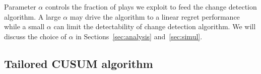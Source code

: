 \documentclass[letterpaper]{article} %
\begin{document}

Parameter $\alpha$
controls the fraction of plays we exploit to feed the change detection algorithm. A large $\alpha$ may drive the algorithm to a linear regret performance while a small $\alpha$ can limit the detectability of change detection algorithm. We will discuss the choice of $\alpha$ in Sections~\ref{sec:analysis} and~\ref{sec:simul}.

\subsection{Tailored CUSUM algorithm}
\end{document}
